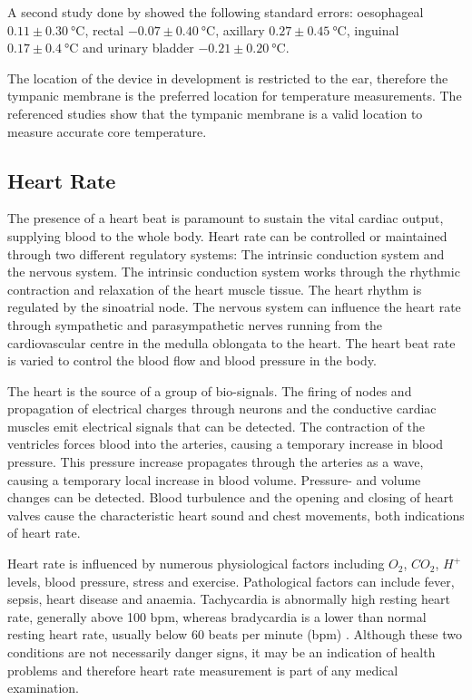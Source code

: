 \medskip
A second study done by \cite{lefrant2003temperature} showed the following standard errors: oesophageal  $0.11 \pm \SI{0.30}{\celsius}$, rectal $-0.07 \pm \SI{0.40}{\celsius}$, axillary $0.27\pm \SI{0.45}{\celsius}$, inguinal $0.17 \pm \SI{0.4}{\celsius}$ and urinary bladder $-0.21 \pm \SI{0.20}{\celsius}$.

\medskip
The location of the device in development is restricted to the ear, therefore the tympanic membrane is the preferred location for temperature measurements. The referenced studies show that the tympanic membrane is a valid location to measure accurate core temperature.

\subsection{Heart Rate}
The presence of a heart beat is paramount to sustain the vital cardiac output, supplying blood to the whole body. Heart rate can be controlled or maintained through two different regulatory systems: The intrinsic conduction system and the nervous system. The intrinsic conduction system works through the rhythmic contraction and relaxation of the heart muscle tissue. The heart rhythm is regulated by the sinoatrial node. The nervous system can influence the heart rate through sympathetic and parasympathetic nerves running from the cardiovascular centre in the medulla oblongata to the heart. The heart beat rate is varied to control the blood flow and blood pressure in the body.

\medskip
The heart is the source of a group of bio-signals. The firing of nodes and propagation of electrical charges through neurons and the conductive cardiac muscles emit electrical signals that can be detected. The contraction of the  ventricles forces blood into the arteries, causing a temporary increase in blood pressure. This pressure increase propagates through the arteries as a wave, causing a temporary local increase in blood volume. Pressure- and volume changes can be detected. Blood turbulence and the opening and closing of heart valves cause the characteristic heart sound and chest movements, both indications of heart rate.

\medskip
Heart rate is influenced by numerous physiological factors including $O_2$, $CO_2$, $H^+$ levels, blood pressure, stress and exercise. Pathological factors can include fever, sepsis, heart disease and anaemia. Tachycardia is abnormally high resting heart rate, generally above 100 bpm, whereas bradycardia is a lower than normal resting heart rate, usually below 60 beats per minute (bpm) \citep{normalRestingHR}. Although these two conditions are not necessarily danger signs, it may be an indication of health problems and therefore heart rate measurement is part of any medical examination.

